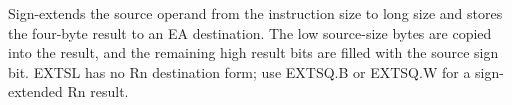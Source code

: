 Sign-extends the source operand from the instruction size to long size and stores the four-byte result to an EA destination. The low source-size bytes are copied into the result, and the remaining high result bits are filled with the source sign bit. EXTSL has no Rn destination form; use EXTSQ.B or EXTSQ.W for a sign-extended Rn result.
